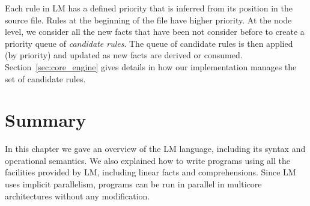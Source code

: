Each rule in LM has a defined priority that is inferred from its position in the
source file.  Rules at the beginning of the file have higher priority. At the
node level, we consider all the new facts that have been not consider before to
create a priority queue of \emph{candidate rules}.  The queue of candidate rules is then
applied (by priority) and updated as new facts are derived or consumed.
Section~\ref{sec:core_engine} gives details in how our implementation manages
the set of candidate rules.

\section{Summary}

In this chapter we gave an overview of the LM language, including its syntax and
operational semantics.  We also explained how to write programs using all the
facilities provided by LM, including linear facts and comprehensions. Since LM
uses implicit parallelism, programs can be run in parallel in multicore
architectures without any modification.
